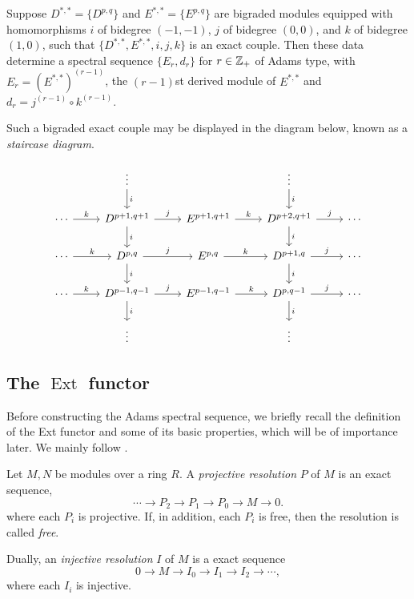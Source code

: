 \documentclass{MetricNotes2023}
\def\inte{\ensuremath\mathbb{Z}}
\DeclareMathOperator{\Ext}{Ext}
\begin{document}
\begin{theorem}\label{2503301131}
Suppose \(D^{*,*}=\{D^{p,q}\}\) and \(E^{*,*}=\{E^{p,q}\}\) are bigraded modules equipped with homomorphisms \(i\) of bidegree \((-1,-1)\), \(j\) of bidegree \((0,0)\), and \(k\) of bidegree \((1,0)\), such that \(\{D^{*,*}, E^{*,*}, i, j, k\}\) is an exact couple. Then these data determine a spectral sequence \(\{E_r, d_r\}\) for \(r\in \inte_+\) of Adams type, with \(E_r=(E^{*,*})^{(r-1)}\), the \((r-1)\)st derived module of \(E^{*,*}\) and \(d_r=j^{(r-1)}\circ k^{(r-1)}\).
\end{theorem}

Such a bigraded exact couple may be displayed in the diagram below, known as a \textit{staircase diagram}.

\[\begin{tikzcd} 
   &  \vdots \arrow[d, "i"] &  & \vdots \arrow[d, "i"] & \\
 \cdots \arrow[r, "k"] & D^{p+1, q+1} \arrow[d, "i"] \arrow[r, "j"] & E^{p+1,q+1}  \arrow[r, "k"] & D^{p+2,q+1} \arrow[d, "i"] \arrow[r, "j"] & \cdots \\
 \cdots \arrow[r, "k"] & D^{p,q} \arrow[d, "i"] \arrow[r, "j"] & E^{p,q}  \arrow[r, "k"] & D^{p+1,q} \arrow[d, "i"] \arrow[r, "j"] & \cdots \\
 \cdots \arrow[r, "k"] & D^{p-1,q-1}  \arrow[d, "i"] \arrow[r, "j"] & E^{p-1,q-1}  \arrow[r, "k"] & D^{p,q-1} \arrow[d, "i"] \arrow[r, "j"] & \cdots \\
 & \vdots &  & \vdots & 
\end{tikzcd}\]

\subsection{The \(\Ext\) functor}\label{2504291247}
Before constructing the Adams spectral sequence, we briefly recall the definition of the Ext functor and some of its basic properties, which will be of importance later. We mainly follow \autocite{weibel}.

\begin{definition}\label{2504211942}
Let \(M, N\) be modules over a ring \(R\). A \textit{projective resolution} \(P\) of \(M\) is an exact sequence,
\[\cdots \to P_2 \to P_1 \to P_0 \to M \to 0.\]
where each \(P_i\) is projective. If, in addition, each \(P_i\) is free, then the resolution is called \textit{free}. 

Dually, an \textit{injective resolution} \(I\) of \(M\) is a exact sequence
\[0 \to M \to I_0 \to I_1 \to I_2 \to \cdots,\]
where each \(I_i\) is injective.
\end{definition}
\end{document}
